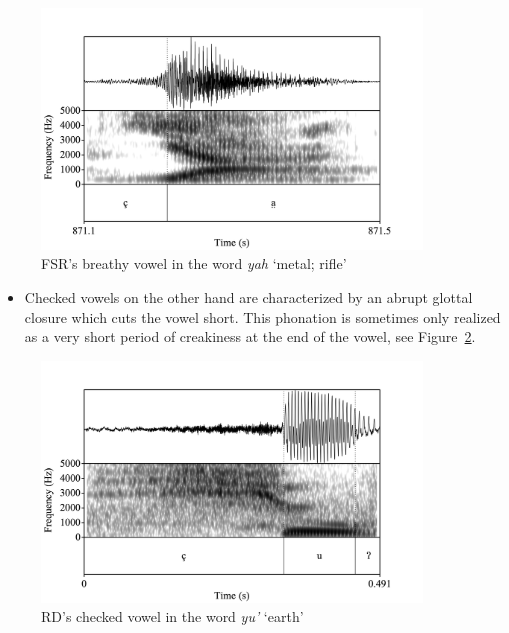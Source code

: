 \documentclass[12pt, letterpaper]{article}
\begin{document}
\begin{figure}[!h]
	\centering
	\includegraphics[width=0.9\textwidth]{../yah.png}
	\caption{FSR's breathy vowel in the word \textit{yah} `metal; rifle'}
	\label{fig:BreathyVowel}
\end{figure}

\begin{itemize}
	\item Checked vowels on the other hand are characterized by an abrupt glottal closure which cuts the vowel short. This phonation is sometimes only realized as a very short period of creakiness at the end of the vowel, see Figure~\ref{fig:CheckedVowel}.  
\end{itemize}

\begin{figure}[!h]
	\centering
	\includegraphics[width=0.9\textwidth]{../RD_yu'.png}
	\caption{RD's checked vowel in the word \textit{yu'} `earth'}
	\label{fig:CheckedVowel}
\end{figure}
\end{document}
